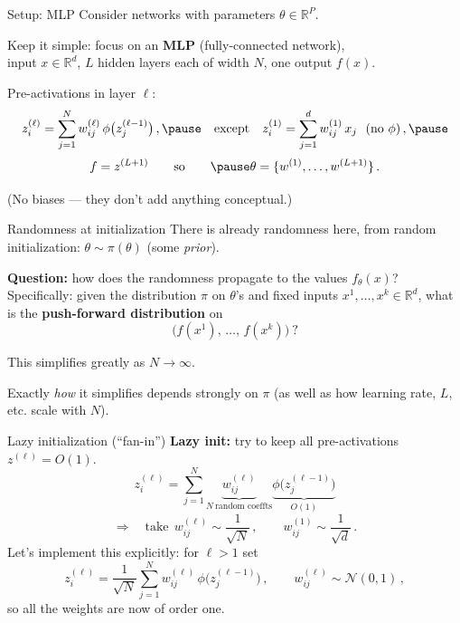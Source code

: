 \documentclass[11pt]{beamer}
\newcommand{\R}{\mathbb{R}}
\newcommand{\hl}[1]{{\color{blue!60!black}\textbf{#1}}}
\begin{document}
\begin{frame}{Setup: MLP}
  Consider networks with parameters $\theta\in\R^P$. \pause
  
  Keep it simple: focus on an
  \hl{MLP} (fully-connected network), \\ input $x \in \R^d$, $L$ hidden
  layers each of width $N$, one output $f(x)$. \pause
  \vspace{2mm}

  Pre-activations in layer $\ell$:
  \[
    z^{(\ell)}_i = \sum_{j=1}^{N} w^{(\ell)}_{ij}\, \phi\big(z^{(\ell-1)}_j\big)\,, \pause
    \quad\text{except}\quad
    z^{(1)}_i = \sum_{j=1}^{d} w^{(1)}_{ij}\, x_j \ \ (\text{no } \phi)\,,\pause
  \]
  \[
    f = z^{(L+1)} \qquad\text{so}\qquad \pause
    \theta = \{w^{(1)}, \dots, w^{(L+1)}\}\,.
  \]
  \vspace{1mm}

  (No biases --- they don't add anything conceptual.)
\end{frame}

\begin{frame}{Randomness at initialization}
  There is already randomness here, from random initialization:
  $\theta \sim \pi(\theta)$ (some \emph{prior}).  \pause
  \vspace{2mm}

  \hl{Question:} how does the randomness propagate to the values
  $f_\theta(x)$? Specifically: given the distribution $\pi$ on
  $\theta$'s and fixed inputs $x^1, \dots, x^k \in \R^d$, what is the
  \hl{push-forward distribution} on
  \[
    \big(f(x^1),\, \dots,\, f(x^k)\big)\ ?
  \] \pause
  \vspace{1mm}

  This simplifies greatly as $N\to \infty$.
  \vspace{1mm}

 Exactly \emph{how} it simplifies depends strongly on $\pi$ (as well as how learning rate, $L$, etc. scale with $N$).
\end{frame}

\begin{frame}{Lazy initialization (``fan-in'')}
  \hl{Lazy init:} try to keep all pre-activations $z^{(\ell)} = O(1)$. \pause
  \[
    z^{(\ell)}_i = \sum_{j=1}^{N} \underbrace{w^{(\ell)}_{ij}}_{N\ \text{random coeffts}}
    \underbrace{\phi\big(z^{(\ell-1)}_j\big)}_{O(1)}
  \] \pause
  \[
    \Longrightarrow\quad
    \text{take}\ \ w^{(\ell)}_{ij} \sim \frac{1}{\sqrt N}\,,\qquad
    w^{(1)}_{ij} \sim \frac{1}{\sqrt d}\,.
  \] \pause
  Let's implement this explicitly: for $\ell>1$ set
  \[
    z^{(\ell)}_i = \frac{1}{\sqrt N}\sum_{j=1}^N w^{(\ell)}_{ij}\,
    \phi\big(z^{(\ell-1)}_j\big)\,,
    \qquad w^{(\ell)}_{ij} \sim \mathcal N(0,1)\,,
  \]
  so all the weights are now of order one.
\end{frame}
\end{document}

